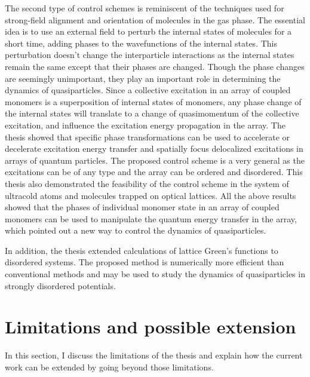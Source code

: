 The second type of control schemes is reminiscent of the techniques used for strong-field alignment and orientation of 
molecules in the gas phase\cite{alignment-review}. The essential idea is to use an external field to perturb the internal states
of molecules for a short time, adding phases to the wavefunctions of the internal states. This perturbation doesn't change
the interparticle interactions as the internal states remain the same except that their phases are changed. Though the phase
changes are seemingly unimportant, they play an important role in determining the dynamics of quasiparticles. Since a collective excitation in an array of coupled monomers is a superposition of internal states of monomers, any phase change
of the internal states will translate to a change of quasimomentum of  the collective excitation, and influence the excitation
energy propagation in the array. The thesis showed that specific phase transformations can be used to accelerate or 
decelerate excitation energy transfer and spatially focus delocalized excitations in arrays of quantum particles.  The 
proposed control scheme is a very general as the excitations can be of any type and the array can be ordered and 
disordered. This thesis also demonstrated the feasibility of the control scheme in the system of ultracold atoms and 
molecules trapped on optical lattices. All the above results showed that the phases of individual monomer state in an array of coupled monomers can be used to manipulate the quantum energy transfer in the array, which 
pointed out a new way to control the dynamics of quasiparticles.  


In addition, the thesis extended calculations of lattice Green's functions to disordered systems. The proposed method
is  numerically more efficient than conventional methods and may be used to study the dynamics of quasiparticles in 
strongly disordered potentials. 

\section{Limitations and possible extension}
In this section, I discuss the limitations of the thesis and explain how the current work can be extended by going beyond those limitations. 

